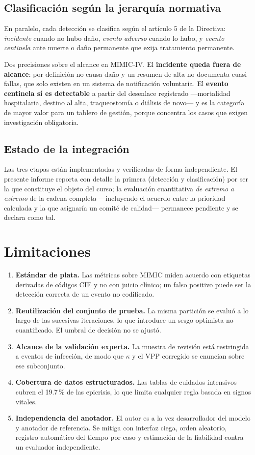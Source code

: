 \documentclass[conference]{IEEEtran}
\begin{document}
\subsection{Clasificación según la jerarquía normativa}
En paralelo, cada detección se clasifica según el artículo 5 de la Directiva:
\emph{incidente} cuando no hubo daño, \emph{evento adverso} cuando lo hubo, y
\emph{evento centinela} ante muerte o daño permanente que exija tratamiento
permanente.

Dos precisiones sobre el alcance en MIMIC-IV. El \textbf{incidente queda fuera
de alcance}: por definición no causa daño y un resumen de alta no documenta
cuasi-fallas, que solo existen en un sistema de notificación voluntaria. El
\textbf{evento centinela sí es detectable} a partir del desenlace registrado
---mortalidad hospitalaria, destino al alta, traqueostomía o diálisis de
novo--- y es la categoría de mayor valor para un tablero de gestión, porque
concentra los casos que exigen investigación obligatoria.

\subsection{Estado de la integración}
Las tres etapas están implementadas y verificadas de forma independiente. El
presente informe reporta con detalle la primera (detección y clasificación) por
ser la que constituye el objeto del curso; la evaluación cuantitativa
\emph{de extremo a extremo} de la cadena completa ---incluyendo el acuerdo
entre la prioridad calculada y la que asignaría un comité de calidad---
permanece pendiente y se declara como tal.

\section{Limitaciones}
\begin{enumerate}
\item \textbf{Estándar de plata.} Las métricas sobre MIMIC miden acuerdo con
etiquetas derivadas de códigos CIE y no con juicio clínico; un falso positivo
puede ser la detección correcta de un evento no codificado.
\item \textbf{Reutilización del conjunto de prueba.} La misma partición se
evaluó a lo largo de las sucesivas iteraciones, lo que introduce un sesgo
optimista no cuantificado. El umbral de decisión no se ajustó.
\item \textbf{Alcance de la validación experta.} La muestra de revisión está
restringida a eventos de infección, de modo que $\kappa$ y el VPP corregido se
enuncian sobre ese subconjunto.
\item \textbf{Cobertura de datos estructurados.} Las tablas de cuidados
intensivos cubren el 19.7\,\% de las epicrisis, lo que limita cualquier regla
basada en signos vitales.
\item \textbf{Independencia del anotador.} El autor es a la vez desarrollador
del modelo y anotador de referencia. Se mitiga con interfaz ciega, orden
aleatorio, registro automático del tiempo por caso y estimación de la
fiabilidad contra un evaluador independiente.
\end{enumerate}
\end{document}

